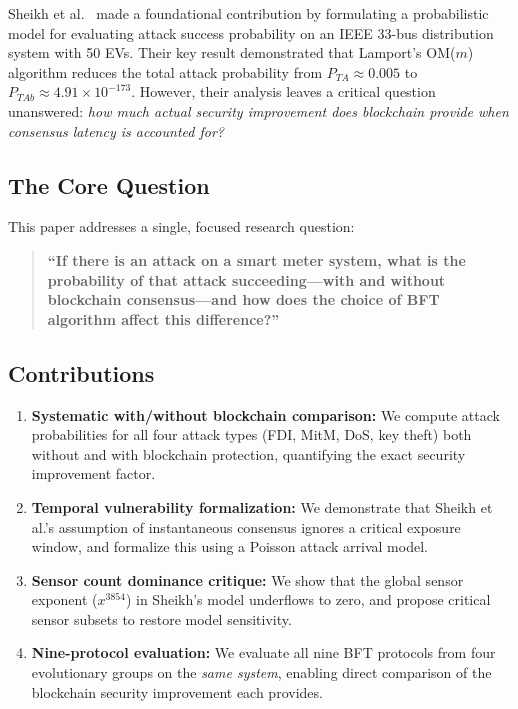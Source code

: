 \documentclass[10pt,twocolumn,letterpaper]{article}
\begin{document}
Sheikh et al.~\cite{sheikh2020} made a foundational contribution by formulating a probabilistic model for evaluating attack success probability on an IEEE 33-bus distribution system with 50 EVs. Their key result demonstrated that Lamport's OM($m$) algorithm reduces the total attack probability from $P_{TA} \approx 0.005$ to $P_{TAb} \approx 4.91 \times 10^{-173}$. However, their analysis leaves a critical question unanswered: \emph{how much actual security improvement does blockchain provide when consensus latency is accounted for?}

\subsection{The Core Question}

This paper addresses a single, focused research question:

\begin{quote}
\textbf{``If there is an attack on a smart meter system, what is the probability of that attack succeeding---with and without blockchain consensus---and how does the choice of BFT algorithm affect this difference?''}
\end{quote}

\subsection{Contributions}

\begin{enumerate}[leftmargin=*]
    \item \textbf{Systematic with/without blockchain comparison:} We compute attack probabilities for all four attack types (FDI, MitM, DoS, key theft) both without and with blockchain protection, quantifying the exact security improvement factor.

    \item \textbf{Temporal vulnerability formalization:} We demonstrate that Sheikh et al.'s assumption of instantaneous consensus ignores a critical exposure window, and formalize this using a Poisson attack arrival model.

    \item \textbf{Sensor count dominance critique:} We show that the global sensor exponent ($x^{3854}$) in Sheikh's model underflows to zero, and propose critical sensor subsets to restore model sensitivity.

    \item \textbf{Nine-protocol evaluation:} We evaluate all nine BFT protocols from four evolutionary groups on the \emph{same system}, enabling direct comparison of the blockchain security improvement each provides.
\end{enumerate}
\end{document}

